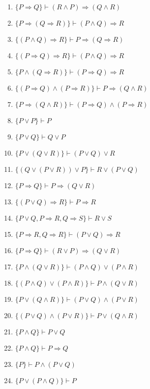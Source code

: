 \begin{enumerate}
    \item $\{P \Rightarrow Q\} \vdash (R \land  P) \Rightarrow (Q \land  R)$
    \item $\{P \Rightarrow (Q \Rightarrow R)\} \vdash (P \land  Q) \Rightarrow R$
    \item $\{(P \land  Q) \Rightarrow R\} \vdash P \Rightarrow (Q \Rightarrow R)$
    \item $\{(P \Rightarrow Q) \Rightarrow R\} \vdash (P \land  Q) \Rightarrow R$
    \item $\{P \land  (Q \Rightarrow R)\} \vdash (P \Rightarrow Q) \Rightarrow R$
    \item $\{(P \Rightarrow Q) \land  (P \Rightarrow R)\} \vdash P \Rightarrow (Q \land  R)$
    \item $\{P \Rightarrow (Q \land  R)\} \vdash (P \Rightarrow Q) \land  (P \Rightarrow R)$
    \item $\{P \lor P\} \vdash P$
    \item $\{P \lor Q\} \vdash Q \lor P$
    \item $\{P \lor (Q \lor R)\} \vdash (P \lor Q) \lor R$
    \item $\{(Q \lor (P \lor R)) \lor P\} \vdash R \lor (P \lor Q)$
    \item $\{P \Rightarrow Q\} \vdash P \Rightarrow (Q \lor R)$
    \item $\{(P \lor Q) \Rightarrow R\} \vdash P \Rightarrow R$
    \item $\{P \lor Q, P \Rightarrow R, Q \Rightarrow S\} \vdash R \lor S$
    \item $\{P \Rightarrow R, Q \Rightarrow R\} \vdash (P \lor Q) \Rightarrow R$
    \item $\{P \Rightarrow Q\} \vdash (R \lor P) \Rightarrow (Q \lor R)$
    \item $\{P \land (Q \lor R)\} \vdash (P \land Q) \lor (P \land R)$
    \item $\{(P \land Q) \lor (P \land R)\} \vdash P \land (Q \lor R)$
    \item $\{P \lor (Q \land R)\} \vdash (P \lor Q) \land (P \lor R)$
    \item $\{(P \lor Q) \land (P \lor R)\} \vdash P \lor (Q \land R)$
    \item $\{P \land Q\} \vdash P \lor Q$
    \item $\{P \land Q\} \vdash P \Rightarrow Q$
    \item $\{P\} \vdash P \land (P \lor Q)$
    \item $\{P \lor (P \land Q)\} \vdash P$

\end{enumerate}
